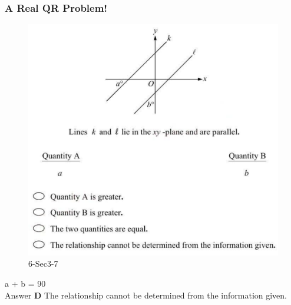 \documentclass[
	11pt, %
]{beamer}
\begin{document}

\begin{frame}
	\frametitle{A Real QR Problem!}


	\begin{figure}
		\includegraphics[width=0.5\linewidth]{Parallel_Slopes_Example_Question1.png}
		\caption{6-Sec3-7}
	\end{figure}
	\pause
a  \textdegree+ b  \textdegree= 90 \textdegree   \\
\pause
\bigskip
Answer \textbf{D } The relationship cannot be determined from the information given.
\end{frame}

\end{document}

